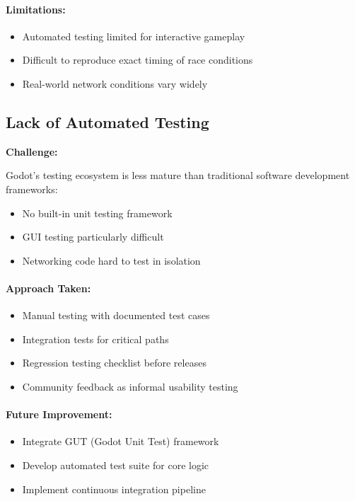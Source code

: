 \paragraph*{Limitations:}

\begin{itemize}
    \item Automated testing limited for interactive gameplay
    \item Difficult to reproduce exact timing of race conditions
    \item Real-world network conditions vary widely
\end{itemize}

\subsection{Lack of Automated Testing}
\label{subsec:automated-testing}

\textbf{Challenge:}

Godot's testing ecosystem is less mature than traditional software development frameworks:
\begin{itemize}
    \item No built-in unit testing framework
    \item GUI testing particularly difficult
    \item Networking code hard to test in isolation
\end{itemize}

\paragraph*{Approach Taken:}

\begin{itemize}
    \item Manual testing with documented test cases
    \item Integration tests for critical paths
    \item Regression testing checklist before releases
    \item Community feedback as informal usability testing
\end{itemize}

\paragraph*{Future Improvement:}

\begin{itemize}
    \item Integrate GUT (Godot Unit Test) framework
    \item Develop automated test suite for core logic
    \item Implement continuous integration pipeline
\end{itemize}

